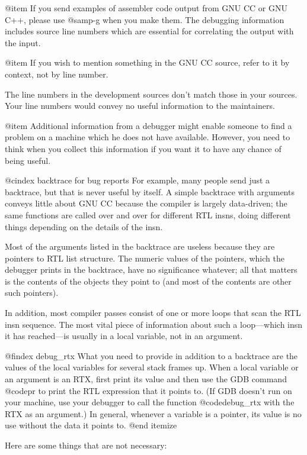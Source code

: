 @item
If you send examples of assembler code output from GNU CC or GNU C++,
please use @samp{-g} when you make them.  The debugging information
includes source line numbers which are essential for correlating the
output with the input.

@item
If you wish to mention something in the GNU CC source, refer to it by
context, not by line number.

The line numbers in the development sources don't match those in your
sources.  Your line numbers would convey no useful information to the
maintainers.

@item
Additional information from a debugger might enable someone to find a
problem on a machine which he does not have available.  However, you
need to think when you collect this information if you want it to have
any chance of being useful.

@cindex backtrace for bug reports
For example, many people send just a backtrace, but that is never
useful by itself.  A simple backtrace with arguments conveys little
about GNU CC because the compiler is largely data-driven; the same
functions are called over and over for different RTL insns, doing
different things depending on the details of the insn.

Most of the arguments listed in the backtrace are useless because they
are pointers to RTL list structure.  The numeric values of the
pointers, which the debugger prints in the backtrace, have no
significance whatever; all that matters is the contents of the objects
they point to (and most of the contents are other such pointers).

In addition, most compiler passes consist of one or more loops that
scan the RTL insn sequence.  The most vital piece of information about
such a loop---which insn it has reached---is usually in a local variable,
not in an argument.

@findex debug_rtx
What you need to provide in addition to a backtrace are the values of
the local variables for several stack frames up.  When a local
variable or an argument is an RTX, first print its value and then use
the GDB command @code{pr} to print the RTL expression that it points
to.  (If GDB doesn't run on your machine, use your debugger to call
the function @code{debug_rtx} with the RTX as an argument.)  In
general, whenever a variable is a pointer, its value is no use
without the data it points to.
@end itemize

Here are some things that are not necessary:

